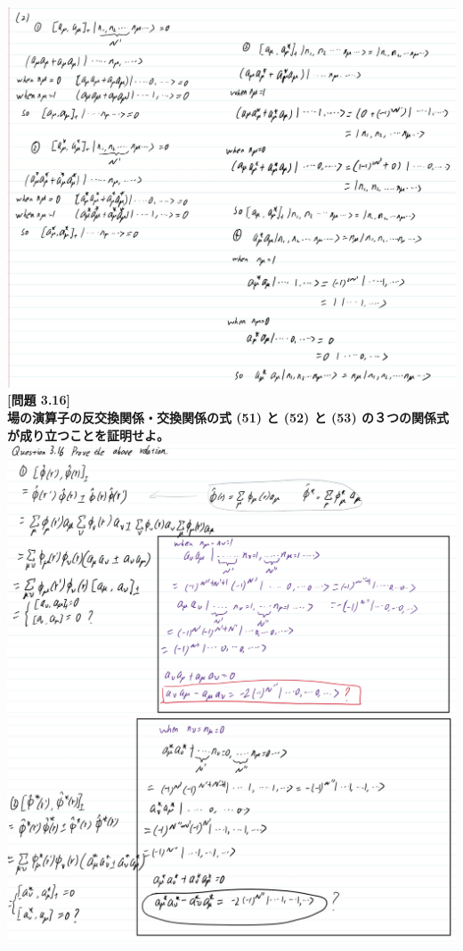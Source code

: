 \documentclass[11pt,largemargins]{homework}
\begin{document}
\includegraphics[scale=0.8]{Question/Q3.10-2.jpg}
\newpage
\question
\textbf{[問題 3.16]\\場の演算子の反交換関係・交換関係の式 (51) と (52) と (53) の３つの関係式が成り立つことを証明せよ。}\\
\includegraphics[scale=0.6]{Question/Q3.16-1.jpg}\\
\includegraphics[scale=0.6]{Question/Q3.16-2.jpg}\\
\end{document}
